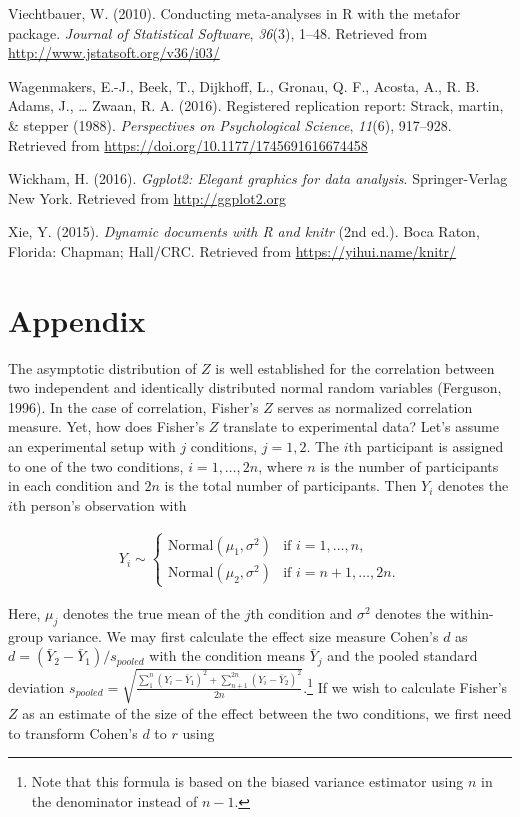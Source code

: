 \documentclass[english,,man]{apa6}
\begin{document}
\leavevmode\hypertarget{ref-R-metafor}{}%
Viechtbauer, W. (2010). Conducting meta-analyses in R with the metafor package. \emph{Journal of Statistical Software}, \emph{36}(3), 1--48. Retrieved from \url{http://www.jstatsoft.org/v36/i03/}

\leavevmode\hypertarget{ref-Wagenmakers:etal:2016b}{}%
Wagenmakers, E.-J., Beek, T., Dijkhoff, L., Gronau, Q. F., Acosta, A., R. B. Adams, J., \ldots{} Zwaan, R. A. (2016). Registered replication report: Strack, martin, \& stepper (1988). \emph{Perspectives on Psychological Science}, \emph{11}(6), 917--928. Retrieved from \url{https://doi.org/10.1177/1745691616674458}

\leavevmode\hypertarget{ref-R-ggplot2}{}%
Wickham, H. (2016). \emph{Ggplot2: Elegant graphics for data analysis}. Springer-Verlag New York. Retrieved from \url{http://ggplot2.org}

\leavevmode\hypertarget{ref-R-knitr}{}%
Xie, Y. (2015). \emph{Dynamic documents with R and knitr} (2nd ed.). Boca Raton, Florida: Chapman; Hall/CRC. Retrieved from \url{https://yihui.name/knitr/}

\endgroup

\hypertarget{appendix}{%
\section{Appendix}\label{appendix}}

The asymptotic distribution of \(Z\) is well established for the correlation between two independent and identically distributed normal random variables (Ferguson, 1996). In the case of correlation, Fisher's \(Z\) serves as normalized correlation measure. Yet, how does Fisher's \(Z\) translate to experimental data?
Let's assume an experimental setup with \(j\) conditions, \(j = 1, 2\). The \(i\)th participant is assigned to one of the two conditions, \(i = 1, \ldots, 2n\), where \(n\) is the number of participants in each condition and \(2n\) is the total number of participants. Then \(Y_i\) denotes the \(i\)th person's observation with

\begin{align}\label{eq:defY}
Y_{i} \sim \begin{cases} \mbox{Normal}(\mu_1, \sigma^2) & \mbox{if } i = 1, \ldots, n,\\
\mbox{Normal}(\mu_2, \sigma^2) & \mbox{if } i = n + 1, \ldots, 2n.\end{cases}
\end{align}

Here, \(\mu_j\) denotes the true mean of the \(j\)th condition and \(\sigma^2\) denotes the within-group variance. We may first calculate the effect size measure Cohen's \(d\) as \(d = (\bar{Y}_2 - \bar{Y}_1) / s_{pooled}\) with the condition means \(\bar{Y}_j\) and the pooled standard deviation \(s_{pooled} = \sqrt{\frac{\sum_1^n(Y_i - \bar{Y}_1)^2 + \sum_{n + 1}^{2n}(Y_i - \bar{Y}_2)^2}{2n}}\).\footnote{Note that this formula is based on the biased variance estimator using \(n\) in the denominator instead of \(n - 1\).} If we wish to calculate Fisher's \(Z\) as an estimate of the size of the effect between the two conditions, we first need to transform Cohen's \(d\) to \(r\) using
\end{document}
